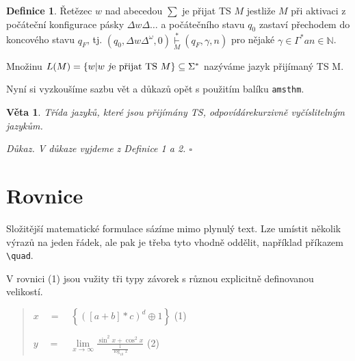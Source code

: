 \documentclass[a4 paper,11pt]{article}
\theoremstyle{definition}
\newtheorem{definice}{Definice}
\theoremstyle{plain}
\newtheorem{veta}{Věta}
\begin{document}
\begin{definice} Řetězec $w$ nad abecedou $\sum$ je přijat \large TS $M$ jestliže $M$ při aktivaci z počáteční konfigurace pásky  $\Delta w \Delta \ldots$ a počátečního stavu $q_{0}$ zastaví přechodem do koncového stavu $q_{F}$, tj. $\left(q_{0}, \Delta w \Delta^{\omega}, 0\right) \underset{M}{\overset{*}{\vdash}} \left(q_{F}, \gamma, n\right)$ pro nějaké $\gamma \in \Gamma^{*} a n \in \mathbb{N}$.

Množinu $L(M)=\{w | w \text { \emph je přijat TS } M\} \subseteq \Sigma^{*}$ nazýváme jazyk přijímaný TS M.

Nyní si vyzkoušíme sazbu vět a důkazů opět s použitím balíku \verb|amsthm|.

\begin{veta} Třída jazyků, které jsou přijímány TS, odpovídárekurzivně vyčíslitelným jazykům.

\end{veta}

\begin{flushleft}

\itshape Důkaz. V důkaze vyjdeme z Definice 1 a 2. \hfill $\square$

\end{flushleft}

\end{definice}



\section{Rovnice}

Složitější matematické formulace sázíme mimo plynulý text. Lze umístit několik výrazů na jeden řádek, ale pak je třeba tyto vhodně oddělit, například příkazem \verb|\quad|.

\vspace{0.618cm}


 
\vspace{0.382cm}


V rovnici (1) jsou vužity tři typy závorek s různou explicitně definovanou velikostí.

\begin{quote}


\hspace{1.cm}$x \quad= \quad\left\{([a+b] * c)^{d} \oplus 1\right\}$ \hfill (1)

\hspace{0.9cm} $y \quad=\quad  \lim \limits_{x \to \infty} \frac{\sin ^{2} x+\cos ^{2} x}{\frac{1}{\log _{10} x}}$ \hfill (2)


\end{quote}
\end{document}
